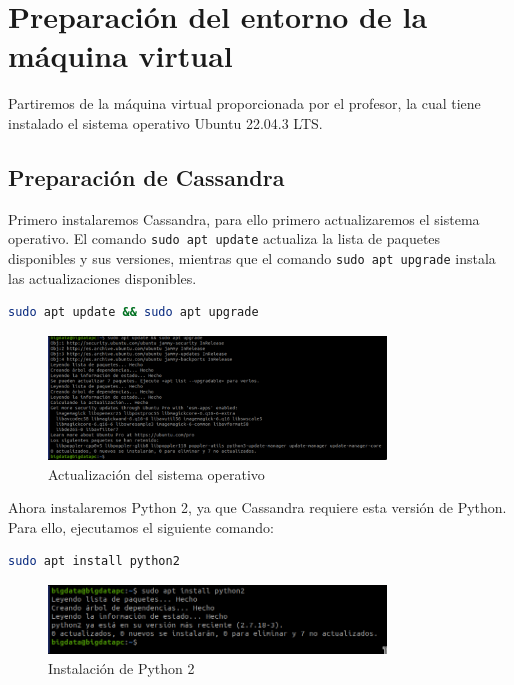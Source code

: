 \chapter{Preparación del entorno de la máquina virtual}

Partiremos de la máquina virtual proporcionada por el profesor, la cual tiene instalado el sistema operativo Ubuntu 22.04.3 LTS.

\section{Preparación de Cassandra}

Primero instalaremos Cassandra, para ello primero actualizaremos el sistema operativo. El comando \texttt{sudo apt update} actualiza la lista de paquetes disponibles y sus versiones, mientras que el comando \texttt{sudo apt upgrade} instala las actualizaciones disponibles.

\begin{lstlisting}[language=bash]
sudo apt update && sudo apt upgrade
\end{lstlisting}

\begin{figure}[H]
    \centering
    \includegraphics[width=0.8\textwidth]{figures/1.png}
    \caption{Actualización del sistema operativo}
\end{figure}

Ahora instalaremos Python 2, ya que Cassandra requiere esta versión de Python. Para ello, ejecutamos el siguiente comando:

\begin{lstlisting}[language=bash]
sudo apt install python2
\end{lstlisting}

\begin{figure}[H]
    \centering
    \includegraphics[width=0.8\textwidth]{figures/2.png}
    \caption{Instalación de Python 2}
\end{figure}

